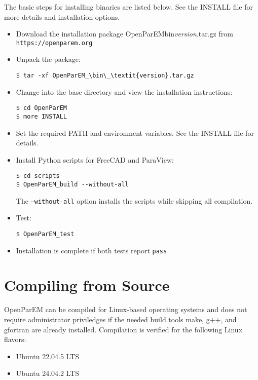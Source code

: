 \documentclass[titlepage]{article}
\renewcommand\_{\textunderscore\linebreak[1]}
\begin{document}
The basic steps for installing binaries are listed below.  See the INSTALL file for more details and installation options.
\begin{itemize}[nosep]
   \item Download the installation package OpenParEM\_bin\_\textit{version}.tar.gz from \verb+https://openparem.org+
   \item Unpack the package:
         \begin{Verbatim}
$ tar -xf OpenParEM_\bin\_\textit{version}.tar.gz
         \end{Verbatim}
   \item Change into the base directory and view the installation instructions:
         \begin{Verbatim}
$ cd OpenParEM
$ more INSTALL
         \end{Verbatim}
   \item Set the required PATH and environment variables.  See the INSTALL file for details.
   \item Install Python scripts for FreeCAD and ParaView:
         \begin{Verbatim}
$ cd scripts
$ OpenParEM_build --without-all
         \end{Verbatim}
         The \texttt{--without-all} option installs the scripts while skipping all compilation.
   \item Test:
         \begin{Verbatim}
$ OpenParEM_test
         \end{Verbatim}
   \item Installation is complete if both tests report \texttt{pass}
\end{itemize}

\section{Compiling from Source}

OpenParEM can be compiled for Linux-based operating systems and does not require administrator priviledges if the needed build tools make, g++, and gfortran are already installed. Compilation is verified for the following Linux flavors:
\begin{itemize}[nosep]
   \item Ubuntu 22.04.5 LTS
   \item Ubuntu 24.04.2 LTS
\end{itemize}
\end{document}
